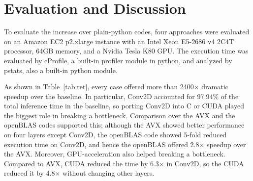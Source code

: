 \documentclass[a4paper,12pt]{article}
\begin{document}
\section{Evaluation and Discussion}
\begin{table}[thbp]
\centering
{}
\caption{The table shows the execution time of each layer's \lstinline{run} method. The baseline represents the given full-python codes\@. The left column of each item means the total execution time in seconds and the right column means the percentage over the inference time.}
\label{tab:ret}
\end{table}

To evaluate the increase over plain-python codes, four approaches were evaluated on an Amazon EC2 p2.xlarge instance with an Intel Xeon E5-2686 v4 2C4T processor, 64GB memory, and a Nvidia Tesla K80 GPU\@. The execution time was evaluated by cProfile, a built-in profiler module in python, and analyzed by pstats, also a built-in python module.

As shown in Table~\ref{tab:ret}, every case offered more than 2400$\times$ dramatic speedup over the baseline. 
In particular, Conv2D accounted for 97.94\% of the total inference time in the baseline, so porting Conv2D into C or CUDA played the biggest role in breaking a bottleneck. 
Comparison over the AVX and the openBLAS codes supported this; although the AVX showed better performance on four layers except Conv2D, the openBLAS code showed 5-fold reduced execution time on Conv2D, and hence the openBLAS offered 2.8$\times$ speedup over the AVX\@. 
Moreover, GPU-acceleration also helped breaking a bottleneck. Compared to AVX, CUDA reduced the time by 6.3$\times$ in Conv2D, so the CUDA reduced it by 4.8$\times$ without changing other layers.
\end{document}
